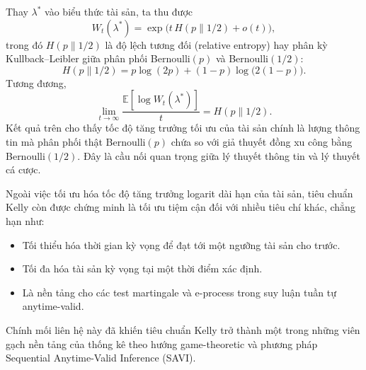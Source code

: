 Thay $\lambda^*$ vào biểu thức tài sản, ta thu được
\begin{equation}
W_t(\lambda^*)
=
\exp
\Big(
t\,H(p\|1/2)
+
o(t)
\Big),
\end{equation}
trong đó $H(p\|1/2)$ là độ lệch tương đối (relative entropy) hay phân kỳ Kullback--Leibler giữa phân phối Bernoulli$(p)$ và Bernoulli$(1/2)$:
\begin{equation}
H(p\|1/2)
=
p\log(2p)
+
(1-p)\log\big(2(1-p)\big).
\end{equation}
Tương đương,
\begin{equation}
\lim_{t\to\infty}
\frac{\mathbb{E}[\log W_t(\lambda^*)]}{t}
=
H(p\|1/2).
\end{equation}
Kết quả trên cho thấy tốc độ tăng trưởng tối ưu của tài sản chính là lượng thông tin mà phân phối thật Bernoulli$(p)$ chứa so với giả thuyết đồng xu công bằng Bernoulli$(1/2)$. Đây là cầu nối quan trọng giữa lý thuyết thông tin và lý thuyết cá cược.

Ngoài việc tối ưu hóa tốc độ tăng trưởng logarit dài hạn của tài sản, tiêu chuẩn Kelly còn được chứng minh là tối ưu tiệm cận đối với nhiều tiêu chí khác, chẳng hạn như:

\begin{itemize}
    \item Tối thiểu hóa thời gian kỳ vọng để đạt tới một ngưỡng tài sản cho trước.
    \item Tối đa hóa tài sản kỳ vọng tại một thời điểm xác định.
    \item Là nền tảng cho các test martingale và e-process trong suy luận tuần tự anytime-valid.
\end{itemize}

Chính mối liên hệ này đã khiến tiêu chuẩn Kelly trở thành một trong những viên gạch nền tảng của thống kê theo hướng game-theoretic và phương pháp Sequential Anytime-Valid Inference (SAVI).

